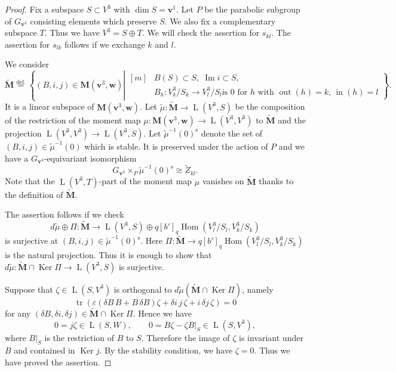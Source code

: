 \documentclass[12pt]{amsart}
\theoremstyle{definition}
\theoremstyle{remark}
\numberwithin{equation}{subsection}
\newcommand{\defeq}{\overset{\operatorname{\scriptstyle def.}}{=}}
\newcommand{\Hom}{\operatorname{Hom}}
\newcommand{\Ker}{\operatorname{Ker}}
\newcommand{\Ima}{\operatorname{Im}}
\newcommand{\tr}{\operatorname{tr}}
\newcommand{\vin}{\operatorname{in}} %
\newcommand{\vout}{\operatorname{out}} %
\newcommand{\bM}{{\mathbf M}} %
\newcommand{\bv}{{\mathbf v}} %
\newcommand{\bw}{{\mathbf w}} %
\newcommand{\HomL}{\operatorname{L}}
\begin{document}
\begin{proof}
Fix a subspace $S\subset V^3$ with $\dim S = \bv^1$. 
Let $P$ be the parabolic subgroup of $G_{\bv^3}$ consisting elements
which preserve $S$.
We also fix a complementary subspace $T$. Thus we have
$V^3 = S\oplus T$.
%
We will check the assertion for $s_{kl}$.
The assertion for $s_{lk}$ follows if we exchange $k$ and $l$.

We consider
\begin{equation*}
  \widetilde\bM
  \defeq \left\{ (B,i,j)\in\bM(\bv^3,\bw)\left|
      \begin{aligned}[m]
        & B(S) \subset S,\; \Ima i\subset S, \\
        & \text{$B_h\colon V^3_k/S_k \to V^3_l/S_l$
        is $0$ for $h$ with $\vout(h) = k$, $\vin(h) = l$}
      \end{aligned}
    \right\}\right..
\end{equation*}
It is a linear subspace of $\bM(\bv^3,\bw)$. Let 
$\widetilde\mu\colon \widetilde\bM\to \HomL(V^3,S)$ be the composition
of the restriction of the moment map
$\mu\colon \bM(\bv^3,\bw)\to \HomL(V^3,V^3)$ to $\widetilde\bM$
and the projection
$\HomL(V^3,V^3)\to \HomL(V^3,S)$.
Let $\widetilde\mu^{-1}(0)^{\operatorname{s}}$ denote the set of
$(B,i,j)\in\widetilde\mu^{-1}(0)$ which is stable. It is preserved
under the action of $P$ and we have a $G_{\bv^3}$-equivariant isomorphism
\begin{equation*}
   G_{\bv^3}\times_{P} \widetilde\mu^{-1}(0)^{\operatorname{s}}
   \cong \widetilde Z_{kl}.
\end{equation*}
Note that the $\HomL(V^3,T)$-part of the moment map
$\mu$ vanishes on $\widetilde\bM$ thanks to the definition of
$\widetilde\bM$.

The assertion follows if we check
\begin{equation*}
   d\widetilde\mu\oplus \Pi \colon \widetilde\bM \to
    \HomL(V^3,S) \oplus q [b']_q \Hom(V^3_l/S_l, V^3_k/S_k)
\end{equation*}
is surjective at $(B,i,j)\in\widetilde\mu^{-1}(0)^{\operatorname{s}}$.
Here $\Pi\colon\widetilde\bM \to
q [b']_q \Hom(V^3_l/S_l, V^3_k/S_k)$ is the natural projection.
Thus it is enough to show that
\(
   d\widetilde\mu\colon \widetilde\bM\cap \Ker\Pi\to \HomL(V^3,S)
\)
is surjective.

Suppose that $\zeta\in\HomL(S,V^3)$ is orthogonal to
$d\widetilde\mu(\widetilde\bM\cap \Ker\Pi)$, namely
\begin{equation*}
   \tr\left(\varepsilon(\delta B\,B + B\,\delta B)\zeta
     + \delta i\,j\,\zeta + i\,\delta j\,\zeta\right) = 0
\end{equation*}
for any $(\delta B, \delta i, \delta j)\in \widetilde\bM\cap \Ker\Pi$.
Hence we have
\begin{equation*}
   0 = j\zeta \in \HomL(S,W), \qquad
   0 = B\zeta - \zeta B|_S \in \HomL(S,V^3),
\end{equation*}
where $B|_S$ is the restriction of $B$ to $S$. Therefore the image of
$\zeta$ is invariant under $B$ and contained in $\Ker j$. By the
stability condition, we have $\zeta = 0$. Thus we have proved the
assertion.
\end{proof}
\end{document}
